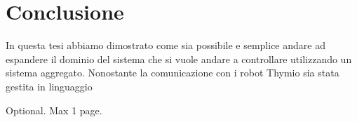 \documentclass[12pt,a4paper,openright,twoside]{book}
\begin{document}
\chapter{Conclusione}
\label{chap:conclusione}

In questa tesi abbiamo dimostrato come sia possibile e semplice andare ad espandere il dominio del sistema che si vuole andare a controllare utilizzando un sistema aggregato. Nonostante la comunicazione con i robot Thymio sia stata gestita in linguaggio 


\backmatter




\begin{acknowledgements} %
Optional. Max 1 page.
\end{acknowledgements}
\end{document}
